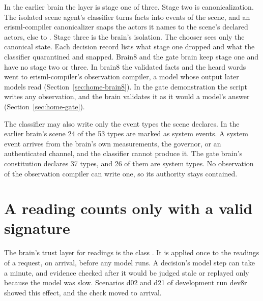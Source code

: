 In the earlier brain the layer is stage one of three. Stage two is canonicalization. The isolated scene agent's classifier
turns facts into events of the scene, and an erisml-compiler canonicalizer snaps the actors it names
to the scene's declared actors, else to . Stage three is the brain's isolation. The
chooser sees only the canonical state. Each decision record lists what stage one dropped and what the
classifier quarantined and snapped. Brain8 and the gate brain keep stage one and have no stage two
or three. In brain8 the validated facts and the heard words went to erisml-compiler's observation
compiler, a model whose output later models read (Section~\ref{sec:home-brain8}). In the gate
demonstration the script writes any observation, and the brain validates it as it would a model's
answer (Section~\ref{sec:home-gate}).

The classifier may also write only the event types the scene declares. In the earlier brain's
scene 24 of the 53 types are marked as system events. A system event arrives from the brain's own
measurements, the governor, or an authenticated channel, and the classifier cannot produce it. The
gate brain's constitution declares 37 types, and 26 of them are system types. No
observation of the observation compiler can write one, so its authority stays contained.

\section{A reading counts only with a valid signature}\label{sec:cont-attest}

The brain's trust layer for readings is the class . It is applied once to the readings
of a request, on arrival, before any model runs. A decision's model step can take a minute, and
evidence checked after it would be judged stale or replayed only because the model was slow.
Scenarios d02 and d21 of development run dev8r showed this effect, and the check moved to arrival.


